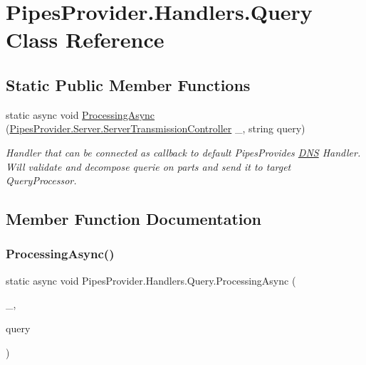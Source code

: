 \hypertarget{class_pipes_provider_1_1_handlers_1_1_query}{}\section{Pipes\+Provider.\+Handlers.\+Query Class Reference}
\label{class_pipes_provider_1_1_handlers_1_1_query}
\subsection*{Static Public Member Functions}
\begin{DoxyCompactItemize}
\item 
static async void \mbox{\hyperlink{class_pipes_provider_1_1_handlers_1_1_query_ad81bd890e7fd1560db907c9f7c5297cb}{Processing\+Async}} (\mbox{\hyperlink{class_pipes_provider_1_1_server_1_1_server_transmission_controller}{Pipes\+Provider.\+Server.\+Server\+Transmission\+Controller}} \+\_\+, string query)
\begin{DoxyCompactList}\small\item\em Handler that can be connected as callback to default Pipes\+Provides \mbox{\hyperlink{class_pipes_provider_1_1_handlers_1_1_d_n_s}{D\+NS}} Handler. Will validate and decompose querie on parts and send it to target Query\+Processor. \end{DoxyCompactList}\end{DoxyCompactItemize}


\subsection{Member Function Documentation}
\mbox{\label{class_pipes_provider_1_1_handlers_1_1_query_ad81bd890e7fd1560db907c9f7c5297cb}} 
\subsubsection{\texorpdfstring{Processing\+Async()}{ProcessingAsync()}}
{\footnotesize\ttfamily static async void Pipes\+Provider.\+Handlers.\+Query.\+Processing\+Async (\begin{DoxyParamCaption}\item[{\mbox{\hyperlink{class_pipes_provider_1_1_server_1_1_server_transmission_controller}{Pipes\+Provider.\+Server.\+Server\+Transmission\+Controller}}}]{\+\_\+,  }\item[{string}]{query }\end{DoxyParamCaption})\hspace{0.3cm}{\ttfamily [static]}}



